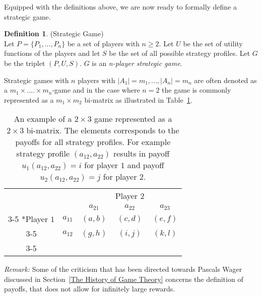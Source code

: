 \documentclass{article}
\theoremstyle{definition}
\newtheorem{definition}[theorem]{Definition}
\theoremstyle{remark}
\begin{document}
Equipped with the definitions above, we are now ready to formally
define a strategic game.

\begin{definition} (Strategic Game) \label{Strategic Game}\\
  Let $P = \{P_1,...,P_n\}$ be a set of players with $n \geq 2$. Let
  $U$ be the set of utility functions of the players and let $S$
  be the set of all possible strategy profiles. Let $G$ be the triplet
  $(P,U,S)$. $G$ is an \emph{n-player strategic game}.  
\end{definition}

Strategic games with $n$ players with $|A_1| = m_1,...,|A_n| = m_n$
are often denoted as a $m_1 \times .... \times m_n$-game and in the
case where $n = 2$ the game is commonly represented as a $m_1 \times
m_2$ bi-matrix as illustrated in Table~\ref{bi-matrix}.\\

\begin{table}[h!]
  \begin{center}
    \setlength{\extrarowheight}{2pt}
    \begin{tabular}{cc|c|c|c|}
      & \multicolumn{2}{c}{} & \multicolumn{1}{c}{Player $2$} & \multicolumn{1}{c}{}\\
      & \multicolumn{1}{c}{} & \multicolumn{1}{c}{$a_{21}$}  &
                                                          \multicolumn{1}{c}{$a_{22}$} & \multicolumn{1}{c}{$a_{23}$} \\\cline{3-5}
      \multirow{2}*{Player $1$}  & $a_{11}$ & $(a,b)$ & $(c,d)$ & $(e,f)$\\\cline{3-5}
      & $a_{12}$ & $(g,h)$ & $(i,j)$ & $(k,l)$\\\cline{3-5}
    \end{tabular}
    \caption{An example of a $2 \times 3$ game represented as a $2
      \times 3$ bi-matrix. The elements corresponds to the payoffs for
      all strategy profiles. For example strategy profile
      $(a_{12},a_{22})$ results in payoff $u_1(a_{12},a_{22}) = i$ for
      player $1$ and payoff $u_2(a_{12},a_{22}) = j$ for player $2$.}
    \label{bi-matrix}
    \end{center}
  \end{table}

\emph{Remark: }Some of the criticism that has been directed towards Pascals Wager
discussed in Section~\ref{The History of Game Theory} concerns the
definition of payoffs, that does not allow for infinitely large
rewards.\\
\end{document}
